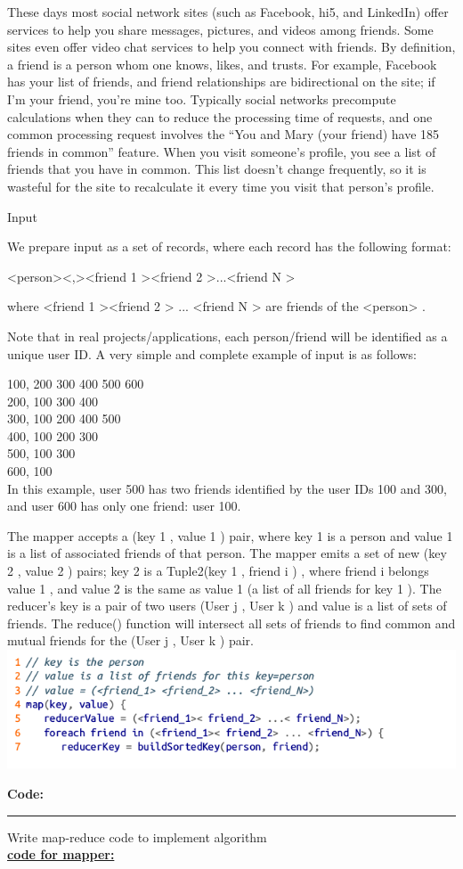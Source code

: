 \documentclass[11pt,article]{memoir}
\begin{document}
\begin{flushleft}
These days most social network sites (such as Facebook, hi5, and LinkedIn) offer
services to help you share messages, pictures, and videos among friends. Some sites
even offer video chat services to help you connect with friends. By definition, a friend
is a person whom one knows, likes, and trusts. For example, Facebook has your list of
friends, and friend relationships are bidirectional on the site; if I’m your friend, you’re
mine too. Typically social networks precompute calculations when they can to reduce
the processing time of requests, and one common processing request involves the
“You and Mary (your friend) have 185 friends in common” feature. When you visit
someone’s profile, you see a list of friends that you have in common. This list doesn’t
change frequently, so it is wasteful for the site to recalculate it every time you visit
that person’s profile.

Input

We prepare input as a set of records, where each record has the following format:

<person><,><friend 1 ><friend 2 >...<friend N >

where <friend 1 ><friend 2 > ... <friend N > are friends of the <person> . 

Note that in real projects/applications, each person/friend will be identified as a unique user ID. A very simple and complete example of input is as follows:

100, 200 300 400 500 600\\
200, 100 300 400\\
300, 100 200 400 500\\
400, 100 200 300\\
500, 100 300\\
600, 100\\
In this example, user 500 has two friends identified by the user IDs 100 and 300, and user 600 has only one friend: user 100.

The mapper accepts a (key 1 , value 1 ) pair, where key 1 is a person and value 1 is a list of associated friends of that person. The mapper
emits a set of new (key 2 , value 2 ) pairs; key 2 is a Tuple2(key 1 , friend i ) , where friend i belongs value 1 , and value 2 is the same as value 1 (a list of all friends for key 1 ). The reducer’s key is a pair of two users (User j , User k ) and value is a list of sets of friends. The reduce() function will intersect all sets of friends to find common and mutual friends for the (User j , User k ) pair.
\includegraphics{1.png}

\afterpage{\newpage}\newpage
\textbf{Code:}\hrule
\vspace{0.5cm}
Write map-reduce code to implement algorithm\\
\textbf{\underline{code for mapper:}}


\end{flushleft}
\end{document}
